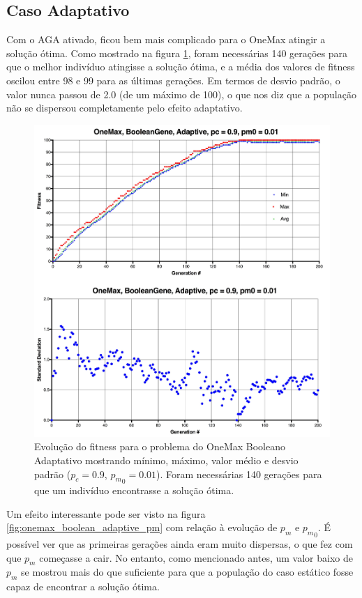 \subsection{Caso Adaptativo}

Com o AGA ativado, ficou bem mais complicado para o OneMax atingir a solução ótima. Como mostrado na figura \ref{fig:onemax_boolean_adaptive}, foram necessárias 140 gerações para que o melhor indivíduo atingisse a solução ótima, e a média dos valores de fitness oscilou entre 98 e 99 para as últimas gerações. Em termos de desvio padrão, o valor nunca passou de 2.0 (de um máximo de 100), o que nos diz que a população não se dispersou completamente pelo efeito adaptativo.

\begin{figure}[ht!]
    \centering \includegraphics[width=1.0\textwidth]{onemax_boolean_adaptive.jpg}
    \caption{Evolução do fitness para o problema do OneMax Booleano Adaptativo mostrando mínimo, máximo, valor médio e desvio padrão ($p_c=0.9$, ${p_m}_0=0.01$). Foram necessárias 140 gerações para que um indivíduo encontrasse a solução ótima.}
    \label{fig:onemax_boolean_adaptive}
\end{figure}

Um efeito interessante pode ser visto na figura \ref{fig:onemax_boolean_adaptive_pm} com relação à evolução de $p_m$ e ${p_m}_0$. É possível ver que as primeiras gerações ainda eram muito dispersas, o que fez com que $p_m$ começasse a cair. No entanto, como mencionado antes, um valor baixo de $p_m$ se mostrou mais do que suficiente para que a população do caso estático fosse capaz de encontrar a solução ótima.

